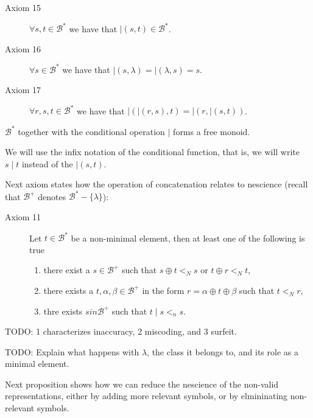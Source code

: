 \vskip 0.25cm

\begin{description}
\item[Axiom 15] $\forall s, t \in \mathcal{B}^\ast$ we have that $\mid(s, t) \in \mathcal{B}^\ast$.
\item[Axiom 16] $\forall s \in \mathcal{B}^\ast$ we have that $\mid (s, \lambda) = \mid( \lambda, s) = s$.
\item[Axiom 17] $\forall r, s, t \in \mathcal{B}^\ast$ we have that $\mid (\mid (r, s), t) = \mid (r, \mid (s, t))$.
\end{description}

$\mathcal{B}^\ast$ together with the conditional operation $\mid$ forms a free monoid.

\begin{notation}
We will use the infix notation of the conditional function, that is, we will write $s \mid t$ instead of the $\mid(s, t)$.
\end{notation}

Next axiom states how the operation of concatenation relates to nescience (recall that $\mathcal{B}^{+}$ denotes $\mathcal{B}^\ast-\{\lambda\}$):

\vskip 0.25cm

\begin{description}
\item[Axiom 11] Let $t \in \mathcal{B}^\ast$ be a non-minimal element, then at least one of the following is true
\begin{enumerate}
\item there exist a $s \in \mathcal{B}^{+}$ such that $s \oplus t <_N s$ or $t \oplus r <_N t$,
\item there exists a $t, \alpha, \beta \in \mathcal{B}^{+}$ in the form $r = \alpha \oplus t \oplus \beta$ such that $t <_N r$,
\item thre exists $s in \mathcal{B}^{+}$ such that $t \mid s <_n s$.
\end{enumerate}
\end{description}

\vskip 0.25cm

{\color{red} TODO: 1 characterizes inaccuracy, 2 miscoding, and 3 surfeit.}

{\color{red} TODO: Explain what happens with $\lambda$, the class it belongs to, and its role as a minimal element.}

Next proposition shows how we can reduce the nescience of the non-valid representations, either by adding more relevant symbols, or by elmininating non-relevant symbols.

